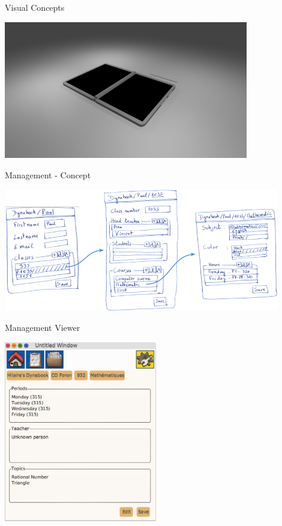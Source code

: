 \documentclass{beamer}
\begin{document}
\begin{frame}{Visual Concepts}
\begin{center}
  \includegraphics[width=0.8\textwidth]{image6-sm.png}
\end{center}
\end{frame}
%
\begin{frame}{Management - Concept}
\begin{center}
  \includegraphics[width=0.9\textwidth]{image17.png}
\end{center}
\end{frame}
%
\begin{frame}{Management Viewer}
\begin{center}
  \includegraphics[width=0.5\textwidth]{prefViewer.png}
\end{center}
\end{frame}
\end{document}
